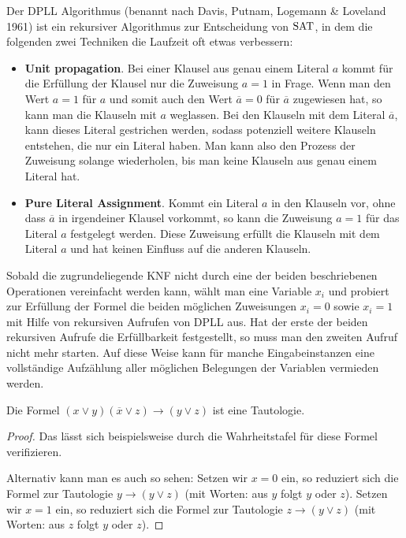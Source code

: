 \begin{bem}
	Der DPLL Algorithmus (benannt nach Davis, Putnam, Logemann \& Loveland 1961) ist ein rekursiver Algorithmus zur Entscheidung von $\operatorname{SAT}$, in dem die folgenden zwei Techniken die Laufzeit oft etwas verbessern: 
	\begin{itemize}
		\item[] \textbf{Unit propagation}. Bei einer Klausel aus genau einem Literal $a$ kommt für die Erfüllung der Klausel nur die Zuweisung  $a=1$ in Frage. Wenn man den Wert $a=1$ für $a$ und somit auch den Wert $\overline{a}=0$ für $\overline{a}$ zugewiesen hat, so kann man die Klauseln mit $a$ weglassen. Bei den Klauseln mit dem Literal $\overline{a}$, kann dieses Literal gestrichen werden, sodass potenziell weitere Klauseln entstehen, die nur ein Literal haben. 
		Man kann also den Prozess der Zuweisung solange wiederholen, bis man keine Klauseln aus genau einem Literal hat. 
		\item[] \textbf{Pure Literal Assignment}. Kommt ein Literal $a$ in den Klauseln vor, ohne dass $\overline{a}$ in irgendeiner Klausel vorkommt, so kann die Zuweisung $a=1$ für das Literal $a$ festgelegt werden. Diese Zuweisung erfüllt die Klauseln mit dem Literal $a$ und hat keinen Einfluss auf die anderen Klauseln. 
	\end{itemize} 
	Sobald die zugrundeliegende KNF nicht durch eine der beiden beschriebenen Operationen vereinfacht werden kann, wählt man eine Variable $x_i$ und probiert zur Erfüllung der Formel  die beiden möglichen Zuweisungen $x_i=0$ sowie $x_i=1$ mit Hilfe von rekursiven Aufrufen von DPLL aus. Hat der erste der beiden rekursiven Aufrufe die Erfüllbarkeit festgestellt, so muss man den zweiten Aufruf nicht mehr starten. Auf diese Weise kann für manche Eingabeinstanzen eine vollständige Aufzählung aller möglichen Belegungen der Variablen vermieden werden. 
\end{bem} 

\begin{lem}[Resolution] \label{resolution}
	Die Formel $(x \vee y) ( \overline{x} \vee z) \to (y \vee z)$ ist eine Tautologie. 
\end{lem} 
\begin{proof}
	Das lässt sich beispielsweise durch die Wahrheitstafel für diese Formel verifizieren.
	
	Alternativ kann man es auch so sehen: 
	Setzen wir $x=0$ ein, so reduziert sich die Formel zur Tautologie $y \to (y \vee z)$ (mit Worten: aus $y$ folgt $y$ oder $z$). Setzen wir $x=1$ ein, so reduziert sich die Formel zur Tautologie $z \to (y \vee z)$ (mit Worten: aus $z$ folgt $y$ oder $z$). 
\end{proof} 

